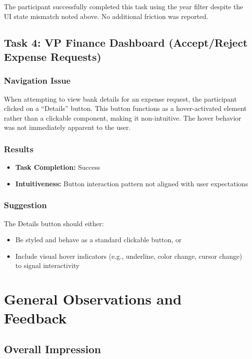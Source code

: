 \documentclass[12pt, titlepage]{article}
\begin{document}
The participant successfully completed this task using the year filter despite the UI state mismatch noted above. No additional friction was reported.

\subsection{Task 4: VP Finance Dashboard (Accept/Reject Expense Requests)}

\subsubsection{Navigation Issue}
When attempting to view bank details for an expense request, the participant clicked on a ``Details'' button. This button functions as a hover-activated element rather than a clickable component, making it non-intuitive. The hover behavior was not immediately apparent to the user.

\subsubsection{Results}
\begin{itemize}
    \item \textbf{Task Completion:} Success
    \item \textbf{Intuitiveness:} Button interaction pattern not aligned with user expectations
\end{itemize}

\subsubsection{Suggestion}
The Details button should either:
\begin{itemize}
    \item Be styled and behave as a standard clickable button, or
    \item Include visual hover indicators (e.g., underline, color change, cursor change) to signal interactivity
\end{itemize}

\section{General Observations and Feedback}

\subsection{Overall Impression}
\end{document}
